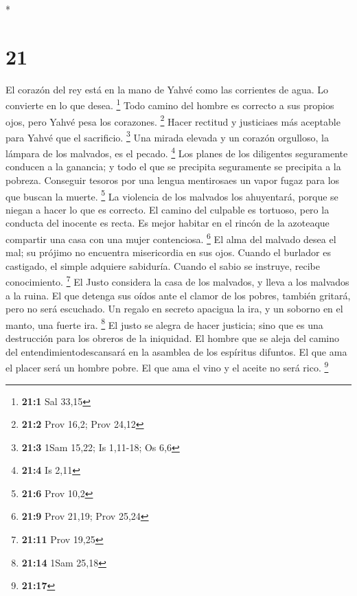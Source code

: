 \begin{paracol}{2}
\begin{otherlanguage}{english}
\end{otherlanguage}

\switchcolumn[0]*

\hypertarget{section-40}{%
\section{21}\label{section-40}}

 El corazón del rey está en la mano de Yahvé como las
corrientes de agua. Lo convierte en lo que desea. \footnote{\textbf{21:1}
  Sal 33,15}  Todo camino del hombre es correcto a sus
propios ojos, pero Yahvé pesa los corazones. \footnote{\textbf{21:2}
  Prov 16,2; Prov 24,12}  Hacer rectitud y justiciaes más
aceptable para Yahvé que el sacrificio. \footnote{\textbf{21:3} 1Sam
  15,22; Is 1,11-18; Os 6,6}  Una mirada elevada y un
corazón orgulloso, la lámpara de los malvados, es el pecado. \footnote{\textbf{21:4}
  Is 2,11}  Los planes de los diligentes seguramente
conducen a la ganancia; y todo el que se precipita seguramente se
precipita a la pobreza.  Conseguir tesoros por una lengua
mentirosaes un vapor fugaz para los que buscan la muerte. \footnote{\textbf{21:6}
  Prov 10,2}  La violencia de los malvados los ahuyentará,
porque se niegan a hacer lo que es correcto.  El camino
del culpable es tortuoso, pero la conducta del inocente es recta.
 Es mejor habitar en el rincón de la azoteaque compartir
una casa con una mujer contenciosa. \footnote{\textbf{21:9} Prov 21,19;
  Prov 25,24}  El alma del malvado desea el mal; su
prójimo no encuentra misericordia en sus ojos.  Cuando el
burlador es castigado, el simple adquiere sabiduría. Cuando el sabio se
instruye, recibe conocimiento. \footnote{\textbf{21:11} Prov 19,25}
 El Justo considera la casa de los malvados, y lleva a
los malvados a la ruina.  El que detenga sus oídos ante
el clamor de los pobres, también gritará, pero no será escuchado.
 Un regalo en secreto apacigua la ira, y un soborno en el
manto, una fuerte ira. \footnote{\textbf{21:14} 1Sam 25,18}
 El justo se alegra de hacer justicia; sino que es una
destrucción para los obreros de la iniquidad.  El hombre
que se aleja del camino del entendimientodescansará en la asamblea de
los espíritus difuntos.  El que ama el placer será un
hombre pobre. El que ama el vino y el aceite no será rico. \footnote{\textbf{21:17}
}
\end{paracol}
